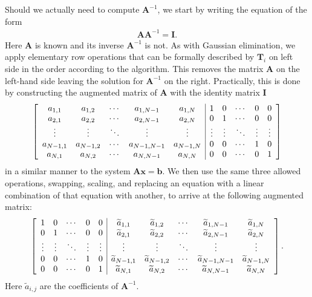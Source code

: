 Should we actually need to compute $\mathbf{A}^{-1}$, we start by writing the equation of the form
\begin{align}
  \mathbf{A} \mathbf{A}^{-1} = \mathbf{I} .
\end{align}
Here $\mathbf{A}$ is known and its inverse $\mathbf{A}^{-1}$ is not. As with Gaussian elimination, we apply elementary row operations that can be formally described by $\mathbf{T}_i$ on left side in the order according to the algorithm. This removes the matrix $\mathbf{A}$ on the left-hand side leaving the solution for $\mathbf{A}^{-1}$ on the right. Practically, this is done by constructing the augmented matrix of $\mathbf{A}$ with the identity matrix $\mathbf{I}$
\begin{align}
  \left[ \begin{array}{c c c c c | c c c c c} 
    a_{1,1}   & a_{1,2}   & \cdots & a_{1,N-1}   & a_{1,N}   & 1      & 0      & \cdots & 0       & 0      \\
  	a_{2,1}   & a_{2,2}   & \cdots & a_{2,N-1}   & a_{2,N}   & 0      & 1      & \cdots & 0       & 0      \\
	\vdots    & \vdots    & \ddots & \vdots      & \vdots    & \vdots & \vdots & \ddots & \vdots  & \vdots \\
	a_{N-1,1} & a_{N-1,2} & \cdots & a_{N-1,N-1} & a_{N-1,N} & 0      & 0      & \cdots & 1       & 0      \\ 
	a_{N,1}   & a_{N,2}   & \cdots & a_{N,N-1}   & a_{N,N}   & 0      & 0      & \cdots & 0       & 1      \\ 
	\end{array} \right]  \nonumber
\end{align}
in a similar manner to the system $\mathbf{Ax} = \mathbf{b}$. We then use the same three allowed operations, swapping, scaling, and replacing an equation with a linear combination of that equation with another, to arrive at the following augmented matrix:
\begin{align}
  \left[ \begin{array}{c c c c c | c c c c c} 
    1       & 0     & \cdots & 0       & 0      & \widetilde{a}_{1,1}   & \widetilde{a}_{1,2}   & \cdots & \widetilde{a}_{1,N-1}   & \widetilde{a}_{1,N}   \\
  	0      & 1      & \cdots & 0       & 0      & \widetilde{a}_{2,1}   & \widetilde{a}_{2,2}   & \cdots & \widetilde{a}_{2,N-1}   & \widetilde{a}_{2,N}   \\
	\vdots & \vdots & \ddots & \vdots  & \vdots & \vdots                & \vdots                & \ddots & \vdots                  & \vdots                \\
	0      & 0      & \cdots & 1       & 0      & \widetilde{a}_{N-1,1} & \widetilde{a}_{N-1,2} & \cdots & \widetilde{a}_{N-1,N-1} & \widetilde{a}_{N-1,N} \\ 
	0      & 0      & \cdots & 0       & 1      & \widetilde{a}_{N,1}   & \widetilde{a}_{N,2}   & \cdots & \widetilde{a}_{N,N-1}   & \widetilde{a}_{N,N}   \\ 
	\end{array} \right] . \nonumber
\end{align}
Here $\widetilde{a}_{i,j}$ are the coefficients of $\mathbf{A}^{-1}$.

